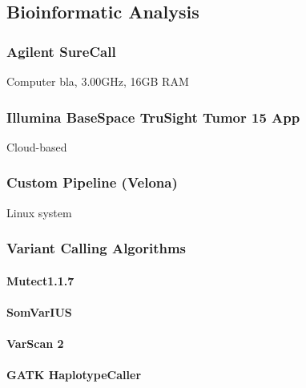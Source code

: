 \subsection{Bioinformatic Analysis}
\subsubsection{Agilent SureCall}
Computer bla, 3.00GHz, 16GB RAM
\subsubsection{Illumina BaseSpace TruSight Tumor 15 App}
Cloud-based
\subsubsection{Custom Pipeline (Velona)}
Linux system
\subsubsection{Variant Calling Algorithms}
\paragraph{Mutect1.1.7}
\paragraph{SomVarIUS}
\paragraph{VarScan 2}
\paragraph{GATK HaplotypeCaller}
